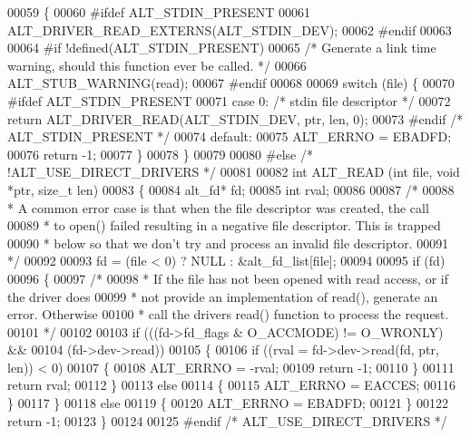\begin{DoxyCode}
00059 \{
00060 \textcolor{preprocessor}{#ifdef ALT\_STDIN\_PRESENT}
00061     ALT_DRIVER_READ_EXTERNS(ALT_STDIN_DEV);
00062 \textcolor{preprocessor}{#endif}
00063 
00064 \textcolor{preprocessor}{#if !defined(ALT\_STDIN\_PRESENT)}
00065     \textcolor{comment}{/* Generate a link time warning, should this function ever be called. */}
00066     ALT_STUB_WARNING(read);
00067 \textcolor{preprocessor}{#endif}
00068 
00069     \textcolor{keywordflow}{switch} (file) \{
00070 \textcolor{preprocessor}{#ifdef ALT\_STDIN\_PRESENT}
00071     \textcolor{keywordflow}{case} 0: \textcolor{comment}{/* stdin file descriptor */}
00072         \textcolor{keywordflow}{return} ALT_DRIVER_READ(ALT_STDIN_DEV, ptr, len, 0);
00073 \textcolor{preprocessor}{#endif }\textcolor{comment}{/* ALT\_STDIN\_PRESENT */}\textcolor{preprocessor}{}
00074     \textcolor{keywordflow}{default}:
00075         ALT_ERRNO = EBADFD;
00076         \textcolor{keywordflow}{return} -1;
00077     \}
00078 \}
00079 
00080 \textcolor{preprocessor}{#else }\textcolor{comment}{/* !ALT\_USE\_DIRECT\_DRIVERS */}\textcolor{preprocessor}{}
00081 
00082 \textcolor{keywordtype}{int} ALT_READ (\textcolor{keywordtype}{int} file, \textcolor{keywordtype}{void} *ptr, \textcolor{keywordtype}{size\_t} len)
00083 \{
00084   alt_fd*  fd;
00085   \textcolor{keywordtype}{int}      rval;
00086 
00087   \textcolor{comment}{/*}
00088 \textcolor{comment}{   * A common error case is that when the file descriptor was created, the call}
00089 \textcolor{comment}{   * to open() failed resulting in a negative file descriptor. This is trapped}
00090 \textcolor{comment}{   * below so that we don't try and process an invalid file descriptor.}
00091 \textcolor{comment}{   */}
00092 
00093   fd = (file < 0) ? NULL : &alt_fd_list[file];
00094   
00095   \textcolor{keywordflow}{if} (fd)
00096   \{
00097     \textcolor{comment}{/*}
00098 \textcolor{comment}{     * If the file has not been opened with read access, or if the driver does}
00099 \textcolor{comment}{     * not provide an implementation of read(), generate an error. Otherwise}
00100 \textcolor{comment}{     * call the drivers read() function to process the request.}
00101 \textcolor{comment}{     */}
00102 
00103     \textcolor{keywordflow}{if} (((fd->fd_flags & O\_ACCMODE) != O\_WRONLY) && 
00104         (fd->dev->read))
00105       \{
00106         \textcolor{keywordflow}{if} ((rval = fd->dev->read(fd, ptr, len)) < 0)
00107         \{
00108           ALT_ERRNO = -rval;
00109           \textcolor{keywordflow}{return} -1;
00110         \}
00111         \textcolor{keywordflow}{return} rval;
00112       \}
00113       \textcolor{keywordflow}{else}
00114       \{
00115         ALT_ERRNO = EACCES;
00116       \}
00117     \}
00118   \textcolor{keywordflow}{else}
00119   \{
00120     ALT_ERRNO = EBADFD;
00121   \}
00122   \textcolor{keywordflow}{return} -1;
00123 \}
00124 
00125 \textcolor{preprocessor}{#endif }\textcolor{comment}{/* ALT\_USE\_DIRECT\_DRIVERS */}\textcolor{preprocessor}{}
\end{DoxyCode}
